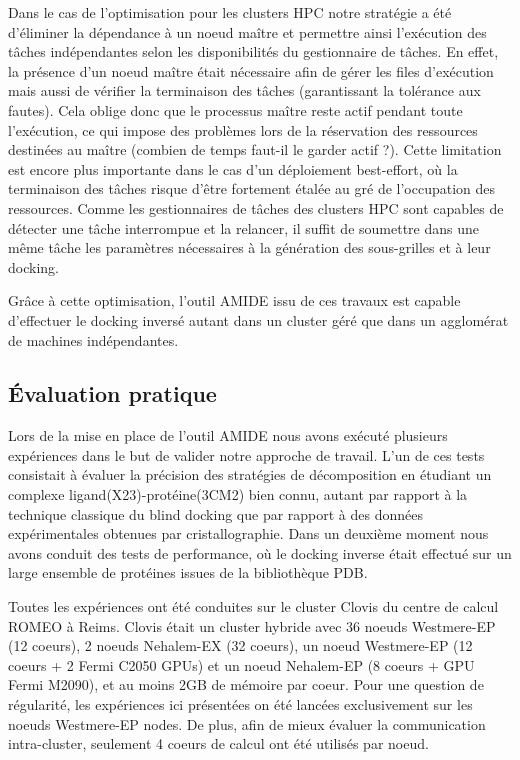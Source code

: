  Dans le cas de l'optimisation pour les clusters HPC notre stratégie a été d'éliminer la dépendance à un noeud maître et permettre ainsi l'exécution des tâches indépendantes selon les disponibilités du gestionnaire de tâches. En effet, la présence d'un noeud maître était nécessaire afin de gérer les files d'exécution mais aussi de vérifier la terminaison des tâches (garantissant la tolérance aux fautes). Cela oblige donc que le processus maître reste actif pendant toute l'exécution, ce qui impose des problèmes lors de la réservation des ressources destinées au maître (combien de temps faut-il le garder actif ?). Cette limitation est encore plus importante dans le cas d'un déploiement best-effort, où la terminaison des tâches risque d'être fortement étalée au gré de l'occupation des ressources. Comme les gestionnaires de tâches des clusters HPC sont capables de détecter une tâche interrompue et la relancer, il suffit de soumettre dans une même tâche les paramètres nécessaires à la génération des sous-grilles et à leur docking. 
 
 Grâce à cette optimisation, l'outil AMIDE issu de ces travaux est capable d'effectuer le docking inversé autant dans un cluster géré que dans un agglomérat de machines indépendantes.
 
 \subsection{Évaluation pratique}
 
 Lors de la mise en place de l'outil AMIDE nous avons exécuté plusieurs expériences dans le but de valider notre approche de travail. L'un de ces tests consistait à évaluer la précision des stratégies de décomposition en étudiant un complexe ligand(X23)-protéine(3CM2) bien connu, autant par rapport à la technique classique du blind docking que par rapport à des données expérimentales obtenues par cristallographie. Dans un deuxième moment nous avons conduit des tests de performance, où le docking inverse était effectué sur un large ensemble de protéines issues de la bibliothèque PDB.
 
Toutes les expériences ont été conduites sur le cluster Clovis du centre de calcul ROMEO à Reims. Clovis était un cluster hybride avec 36 noeuds Westmere-EP (12 coeurs), 2 noeuds Nehalem-EX (32 coeurs), un noeud Westmere-EP (12 coeurs + 2 Fermi C2050 GPUs) et un noeud Nehalem-EP (8 coeurs + GPU Fermi M2090), et au moins 2GB de mémoire par coeur. Pour une question de régularité, les expériences ici présentées on été lancées exclusivement sur les noeuds Westmere-EP nodes. De plus, afin de mieux évaluer la communication intra-cluster, seulement 4 coeurs de calcul ont été utilisés par noeud.
 
